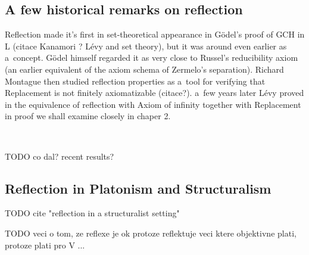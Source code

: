\documentclass[12pt,a4paper]{article}
\begin{document}

\subsection{A few historical remarks on reflection}\label{sec:History}  %
 
 
Reflection made it's first in set-theoretical appearance in G{\"o}del's proof of GCH in L  (citace Kanamori ? Lévy and set theory), but it was around even earlier as a~concept. G{\"o}del himself regarded it as very close to Russel's reducibility axiom (an earlier equivalent of the axiom schema of Zermelo's separation). Richard Montague then studied reflection properties as a~tool for verifying that Replacement is not finitely axiomatizable (citace?). a~few years later Lévy proved in \cite{Levy60a} the equivalence of reflection with Axiom of infinity together with Replacement in proof we shall examine closely in chaper 2.

\

TODO co dal? recent results?

\subsection{Reflection in Platonism and Structuralism}
TODO cite "reflection in a structuralist setting"

TODO veci o tom, ze reflexe je ok protoze reflektuje veci ktere objektivne plati, protoze plati pro V ...
\end{document}
